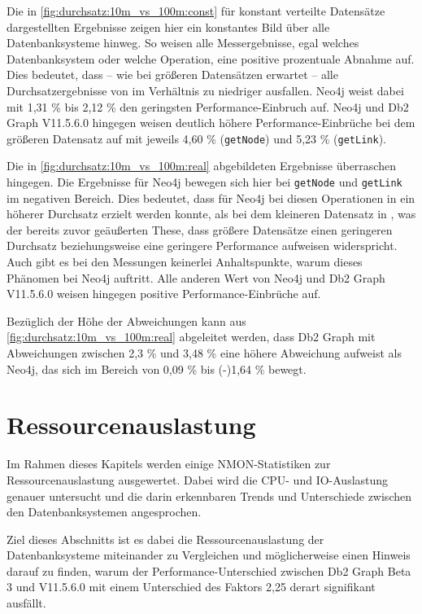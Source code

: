 Die in \autoref{fig:durchsatz:10m_vs_100m:const} für konstant verteilte Datensätze dargestellten Ergebnisse zeigen hier ein konstantes Bild über alle Datenbanksysteme hinweg. So weisen alle Messergebnisse, egal welches Datenbanksystem oder welche Operation, eine positive prozentuale Abnahme auf. Dies bedeutet, dass -- wie bei größeren Datensätzen erwartet -- alle Durchsatzergebnisse von  im Verhältnis zu  niedriger ausfallen. Neo4j weist dabei mit 1,31 \% bis 2,12 \% den geringsten Performance-Einbruch auf. Neo4j und Db2 Graph V11.5.6.0 hingegen weisen deutlich höhere Performance-Einbrüche bei dem größeren Datensatz auf mit jeweils 4,60 \% (\texttt{getNode}) und 5,23 \% (\texttt{getLink}). 

Die in \autoref{fig:durchsatz:10m_vs_100m:real} abgebildeten Ergebnisse überraschen hingegen. Die Ergebnisse für Neo4j bewegen sich hier bei \texttt{getNode} und \texttt{getLink} im negativen Bereich. Dies bedeutet, dass für Neo4j bei diesen Operationen in  ein höherer Durchsatz erzielt werden konnte, als bei dem kleineren Datensatz in , was der bereits zuvor geäußerten These, dass größere Datensätze einen geringeren Durchsatz beziehungsweise eine geringere Performance aufweisen widerspricht. Auch gibt es bei den Messungen keinerlei Anhaltspunkte, warum dieses Phänomen bei Neo4j auftritt. Alle anderen Wert von Neo4j und Db2 Graph V11.5.6.0 weisen hingegen positive Performance-Einbrüche auf.

Bezüglich der Höhe der Abweichungen kann aus \autoref{fig:durchsatz:10m_vs_100m:real} abgeleitet werden, dass Db2 Graph mit Abweichungen zwischen 2,3 \% und 3,48 \% eine höhere Abweichung aufweist als Neo4j, das sich im Bereich von 0,09 \% bis (-)1,64 \% bewegt. 

\section{Ressourcenauslastung}
\label{auswertung:ressourcenauslastung}

Im Rahmen dieses Kapitels werden einige NMON-Statistiken zur Ressourcenauslastung ausgewertet. Dabei wird die CPU- und IO-Aus\-last\-ung genauer untersucht und die darin erkennbaren Trends und Unterschiede zwischen den Datenbanksystemen angesprochen. 

Ziel dieses Abschnitts ist es dabei die Ressourcenauslastung der Datenbanksysteme miteinander zu Vergleichen und möglicherweise einen Hinweis darauf zu finden, warum der Performance-Unterschied zwischen Db2 Graph Beta 3 und V11.5.6.0 mit einem Unterschied des Faktors 2,25 derart signifikant ausfällt. 

